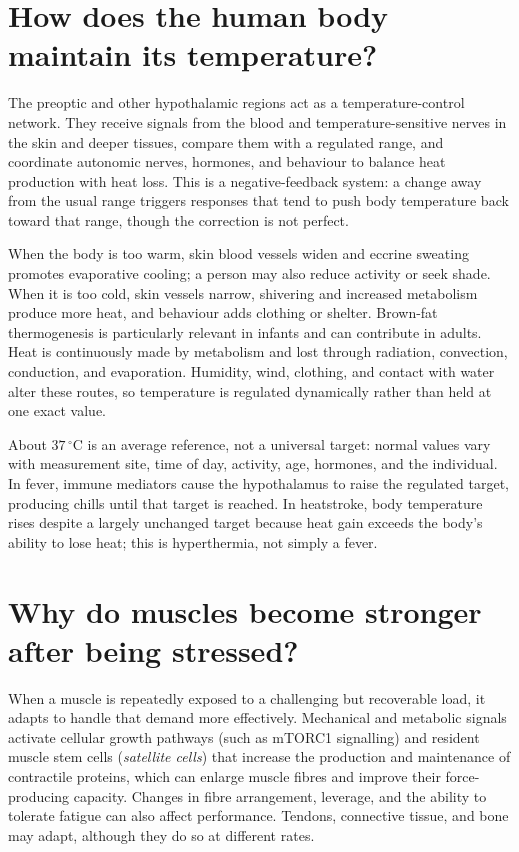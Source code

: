 \documentclass[11pt,oneside]{report}
\begin{document}
\section{How does the human body maintain its temperature?}

The preoptic and other hypothalamic regions act as a temperature-control
network. They receive signals from the blood and temperature-sensitive nerves
in the skin and deeper tissues, compare them with a regulated range, and
coordinate autonomic nerves, hormones, and behaviour to balance heat production
with heat loss. This is a negative-feedback system: a change away from the
usual range triggers responses that tend to push body temperature back toward
that range, though the correction is not perfect.

When the body is too warm, skin blood vessels widen and eccrine sweating
promotes evaporative cooling; a person may also reduce activity or seek shade.
When it is too cold, skin vessels narrow, shivering and increased metabolism
produce more heat, and behaviour adds clothing or shelter. Brown-fat
thermogenesis is particularly relevant in infants and can contribute in adults.
Heat is continuously made by metabolism and lost through radiation, convection,
conduction, and evaporation. Humidity, wind, clothing, and contact with water
alter these routes, so temperature is regulated dynamically rather than held at
one exact value.

About $37\,^{\circ}\mathrm{C}$ is an average reference, not a universal target:
normal values vary with measurement site, time of day, activity, age, hormones,
and the individual. In fever, immune mediators cause the hypothalamus to raise
the regulated target, producing chills until that target is reached. In
heatstroke, body temperature rises despite a largely unchanged target because
heat gain exceeds the body's ability to lose heat; this is hyperthermia, not
simply a fever.

\section{Why do muscles become stronger after being stressed?}

When a muscle is repeatedly exposed to a challenging but recoverable load, it
adapts to handle that demand more effectively. Mechanical and metabolic
signals activate cellular growth pathways (such as mTORC1 signalling) and
resident muscle stem cells (\emph{satellite cells}) that increase the
production and maintenance of contractile proteins, which can enlarge muscle
fibres and improve their force-producing capacity. Changes in fibre arrangement, leverage, and the
ability to tolerate fatigue can also affect performance. Tendons, connective
tissue, and bone may adapt, although they do so at different rates.
\end{document}

